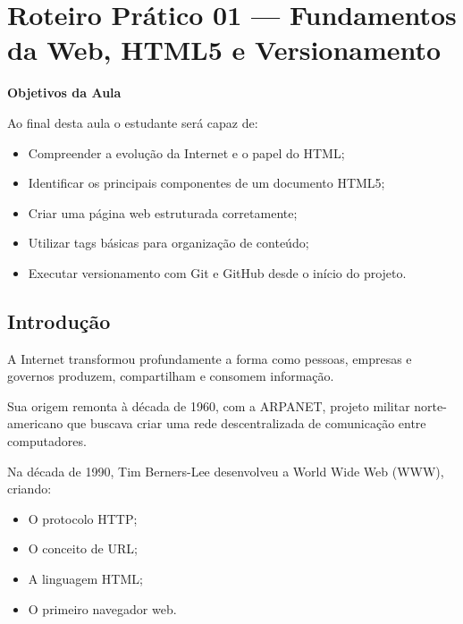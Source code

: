 \documentclass[12pt,a4paper]{article}
\begin{document}

\section{Roteiro Prático 01 — Fundamentos da Web, HTML5 e Versionamento}


\begin{boxObjetivos}
\textbf{Objetivos da Aula}

Ao final desta aula o estudante será capaz de:

\begin{itemize}
\item Compreender a evolução da Internet e o papel do HTML;
\item Identificar os principais componentes de um documento HTML5;
\item Criar uma página web estruturada corretamente;
\item Utilizar tags básicas para organização de conteúdo;
\item Executar versionamento com Git e GitHub desde o início do projeto.
\end{itemize}
\end{boxObjetivos}


\subsection{Introdução}

A Internet transformou profundamente a forma como pessoas, empresas e governos produzem, compartilham e consomem informação. 

Sua origem remonta à década de 1960, com a ARPANET, projeto militar norte-americano que buscava criar uma rede descentralizada de comunicação entre computadores.

Na década de 1990, Tim Berners-Lee desenvolveu a World Wide Web (WWW), criando:

\begin{itemize}
\item O protocolo HTTP;
\item O conceito de URL;
\item A linguagem HTML;
\item O primeiro navegador web.
\end{itemize}
\end{document}
